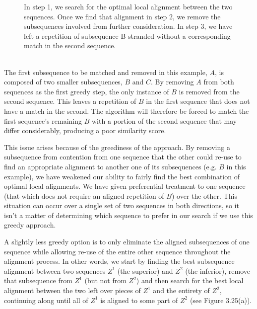 \documentclass[a4paper,12pt]{report} 	%
\numberwithin{figure}{chapter}
\numberwithin{table}{chapter}
\numberwithin{equation}{chapter}
\begin{document}
\begin{flushleft}
\begin{figure}[!p]
\begin{center}
\caption[Symmetric Greedy Removal After Matching]{In step 1, we search for the optimal local alignment between the two sequences. Once we find that alignment in step 2, we remove the subsequences involved from further consideration. In step 3, we have left a repetition of subsequence B stranded without a corresponding match in the second sequence.}
\end{center}
\end{figure}
\\
The first subsequence to be matched and removed in this example, $A$, is composed of two smaller subsequences, $B$ and $C$. By removing $A$ from both sequences as the first greedy step, the only instance of $B$ is removed from the second sequence. This leaves a repetition of $B$ in the first sequence that does not have a match in the second. The algorithm will therefore be forced to match the first sequence's remaining $B$ with a portion of the second sequence that may differ considerably, producing a poor similarity score.

This issue arises because of the greediness of the approach. By removing a subsequence from contention from one sequence that the other could re-use to find an appropriate alignment to another one of its subsequences (e.g. $B$ in this example), we have weakened our ability to fairly find the best combination of optimal local alignments. We have given preferential treatment to one sequence (that which does not require an aligned repetition of $B$) over the other. This situation can occur over a single set of two sequences in both directions, so it isn't a matter of determining which sequence to prefer in our search if we use this greedy approach. 

A slightly less greedy option is to only eliminate the aligned subsequences of one sequence while allowing re-use of the entire other sequence throughout the alignment process. In other words, we start by finding the best subsequence alignment between two sequences $Z^1$ (the superior) and $Z^2$ (the inferior), remove that subsequence from $Z^1$ (but not from $Z^2$) and then search for the best local alignment between the two left over pieces of $Z^1$ and the entirety of $Z^2$, continuing along until all of $Z^1$ is aligned to some part of $Z^2$ (see Figure 3.25(a)).


\end{flushleft}
\end{document}

